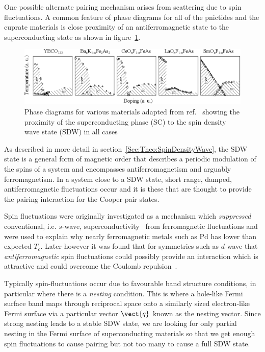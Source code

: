 One possible alternate pairing mechanism arises from scattering due to spin fluctuations. A common feature of phase diagrams for all of the pnictides and the cuprate materials is close proximity of an antiferromagnetic state to the superconducting state as shown in figure~\ref{Fig:Intro:PhaseDiagrams}.
\begin{figure}[htbp]
    \begin{center}
        \includegraphics[scale=1.0]{Chapter-Introduction/Figures/PhaseDiagrams/PhaseDiagrams}
        \caption{Phase diagrams for various \highTc materials adapted from ref.~\cite{Uemura2009} showing the proximity of the superconducting phase (SC) to the spin density wave state (SDW) in all cases}
        \label{Fig:Intro:PhaseDiagrams}
    \end{center}
\end{figure}
As described in more detail in section~\ref{Sec:Theo:SpinDensityWave}, the \ac{SDW} state is a general form of magnetic order that describes a periodic modulation of the spins of a system and encompasses antiferromagnetism and arguably ferromagnetism. In a system close to a \ac{SDW} state, short range, damped, antiferromagnetic fluctuations occur and it is these that are thought to provide the pairing interaction for the Cooper pair states.

Spin fluctuations were originally investigated as a mechanism which \emph{suppressed} conventional, i.e. $s$-wave, superconductivity~\cite{Berk1966} from ferromagnetic fluctuations and were used to explain why nearly ferromagnetic metals such as Pd has lower than expected $T_c$. Later however it was found that for symmetries such as $d$-wave that \emph{antiferromagnetic} spin fluctuations could possibly provide an interaction which is attractive and could overcome the Coulomb repulsion~\cite{Scalapino1995}.

Typically spin-fluctuations occur due to favourable band structure conditions, in particular where there is a \emph{nesting} condition. This is where a hole-like Fermi surface band maps through reciprocal space onto a similarly sized electron-like Fermi surface via a particular vector $\vect{q}$ known as the nesting vector. Since strong nesting leads to a stable \ac{SDW} state, we are looking for only partial nesting in the Fermi surface of superconducting materials so that we get enough spin fluctuations to cause pairing but not too many to cause a full \ac{SDW} state.

